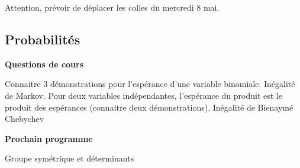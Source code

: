 





Attention, prévoir de déplacer les colles du mercredi 8 mai.
\subsection{Probabilités}


\bigskip
\begin{center}
 \textbf{Questions de cours}
\end{center}
Connaitre 3 démonstrations pour l'espérance d'une variable binomiale. Inégalité de Markov. Pour deux variables indépendantes, l'espérance du produit est le produit des espérances (connaitre deux démonstrations). Inégalité de Bienaymé Chebychev
\begin{center}
 \textbf{Prochain programme}
\end{center}
Groupe symétrique et déterminants

